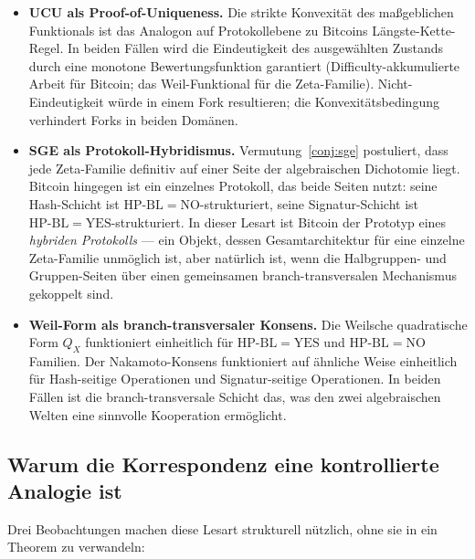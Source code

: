 \documentclass[11pt]{article}
\theoremstyle{definition}
\theoremstyle{remark}
\newcommand{\HBL}{\mathrm{HP\text{-}BL}}
\begin{document}
\begin{itemize}
\item \textbf{UCU als Proof-of-Uniqueness.}
Die strikte Konvexität des maßgeblichen Funktionals ist das Analogon auf
Protokollebene zu Bitcoins Längste-Kette-Regel. In beiden Fällen wird
die Eindeutigkeit des ausgewählten Zustands durch eine monotone Bewertungsfunktion
garantiert (Difficulty-akkumulierte Arbeit für Bitcoin; das Weil-Funktional
für die Zeta-Familie). Nicht-Eindeutigkeit würde in einem Fork resultieren; die
Konvexitätsbedingung verhindert Forks in beiden Domänen.

\item \textbf{SGE als Protokoll-Hybridismus.}
Vermutung~\ref{conj:sge} postuliert, dass jede Zeta-Familie definitiv auf
einer Seite der algebraischen Dichotomie liegt. Bitcoin hingegen ist ein einzelnes
Protokoll, das beide Seiten nutzt: seine Hash-Schicht ist $\HBL = \mathrm{NO}$-strukturiert,
seine Signatur-Schicht ist $\HBL = \mathrm{YES}$-strukturiert. In dieser Lesart ist
Bitcoin der Prototyp eines \emph{hybriden Protokolls} --- ein Objekt, dessen Gesamtarchitektur
für eine einzelne Zeta-Familie unmöglich ist, aber natürlich ist,
wenn die Halbgruppen- und Gruppen-Seiten über einen gemeinsamen
branch-transversalen Mechanismus gekoppelt sind.

\item \textbf{Weil-Form als branch-transversaler Konsens.}
Die Weilsche quadratische Form $Q_X$ funktioniert einheitlich für
$\HBL = \mathrm{YES}$ und $\HBL = \mathrm{NO}$ Familien. Der Nakamoto-Konsens
funktioniert auf ähnliche Weise einheitlich für Hash-seitige Operationen und Signatur-seitige
Operationen. In beiden Fällen ist die branch-transversale
Schicht das, was den zwei algebraischen Welten eine sinnvolle Kooperation ermöglicht.
\end{itemize}

\subsection{Warum die Korrespondenz eine kontrollierte Analogie ist}
\label{sec:blockchain-substance}

Drei Beobachtungen machen diese Lesart strukturell nützlich, ohne sie in ein
Theorem zu verwandeln:
\end{document}
